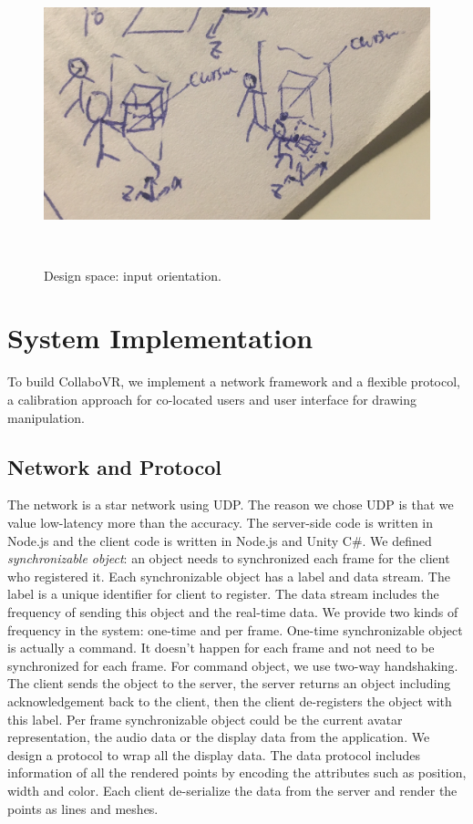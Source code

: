 \documentclass{sigchi}
\begin{document}
\begin{figure}[b!]
 \centering
 \includegraphics[width=0.9\columnwidth]{inputorientation.jpg}
 \caption{Design space: input orientation.
 }~\label{fig:inputorientation}
\end{figure}

\section{System Implementation}
To build CollaboVR, we implement a network framework and a flexible protocol, a calibration approach for co-located users and user interface for drawing manipulation.

\subsection{Network and Protocol}
The network is a star network using UDP. The reason we chose UDP is that we value low-latency more than the accuracy. The server-side code is written in Node.js and the client code is written in Node.js and Unity C\#. We defined \textit{synchronizable object}: an object needs to synchronized each frame for the client who registered it. Each synchronizable object has a label and data stream. The label is a unique identifier for client to register. The data stream includes the frequency of sending this object and the real-time data. We provide two kinds of frequency in the system: one-time and per frame. One-time synchronizable object is actually a command. It doesn't happen for each frame and not need to be synchronized for each frame. For command object, we use two-way handshaking. The client sends the object to the server, the server returns an object including acknowledgement back to the client, then the client de-registers the object with this label. Per frame synchronizable object could be the current avatar representation, the audio data or the display data from the application. We design a protocol to wrap all the display data. The data protocol includes information of all the rendered points by encoding the attributes such as position, width and color. Each client de-serialize the data from the server and render the points as lines and meshes.
\end{document}
